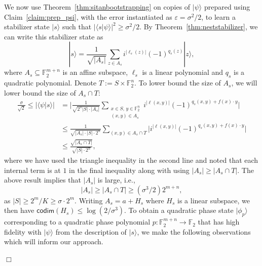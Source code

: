 \documentclass[11pt]{amsart}
\newcommand{\F}{\mathbb{F}} %
\newcommand{\ket}[1]{|#1\rangle}
\theoremstyle{plain}
\theoremstyle{definition}
\theoremstyle{remark}
\renewenvironment{proof}[1][]{
    	\begin{trivlist}
     	\item[\hspace{\labelsep}{\em\noindent Proof#1:\/}]}
     	{{\hfill$\Box$}
    	\end{trivlist}
  }
\begin{document}
\begin{proof}[ of Lemma~\ref{lem:findingfreimanquantum}]
We now use Theorem~\ref{thm:sitanbootstrapping} on copies of $\ket{\psi}$ prepared using Claim~\ref{claim:prep_psi}, with the error instantiated as $\varepsilon=\sigma^{2}/2$, to learn a stabilizer state $\ket{s}$ such that $|\langle s| \psi \rangle|^2 \geq \sigma^{2}/2$. By Theorem~\ref{thm:neststabilizer}, we can write this stabilizer state as
\begin{equation}\label{eq:stab_state_from_bootstrapping}
\ket{s} = \frac{1}{\sqrt{|A_s|}} \sum_{z \in A_s} i^{|\ell_s(z)|} (-1)^{q_s(z)} \ket{z},    
\end{equation}
where $A_s \subseteq \F_2^{m+n}$ is an affine subspace, $\ell_s$ is a linear polynomial and $q_s$ is a quadratic polynomial.
Denote $T:= S \times \F_2^n$.
To lower bound the size of $A_s$, we will lower bound the size of $A_s \cap T$:
\begin{align*}
\frac{\sigma}{\sqrt{2}} \leq |\langle \psi | s \rangle| 
&= \Big|\frac{1}{\sqrt{2^n |S|\cdot |A_s|}} \sum_{\substack{x \in S,\, y \in \F_2^n \\ (x,y) \in A_s}} i^{|\ell(x,y)|} (-1)^{q_s(x,y) + f(x)\cdot y} \Big| \\
&\leq \frac{1}{\sqrt{|A_s| \cdot |S|\cdot 2^n}} \sum_{(x,y) \in A_s \cap T} \Big| i^{|\ell(x,y)|} (-1)^{q_s(x,y) + f(x)\cdot y} \Big|\\
& \leq \frac{\sqrt{|A_s \cap T|}}{\sqrt{|S|\cdot 2^n}},    
\end{align*}
where we have used the triangle inequality in the second line and noted that each internal term is at $1$ in the final inequality along with using $|A_s| \geq |A_s \cap T|$. The above result implies that $|A_s|$ is large, i.e.,
\begin{equation}\label{eq:lb_size_As}
|A_s| \geq |A_s \cap T| \geq (\sigma^{3}/2) 2^{m+n},
\end{equation}
as $|S| \geq 2^m/K \geq \sigma \cdot 2^m$. Writing $A_s = a + H_s$ where $H_s$ is a linear subspace, we then have $\textsf{codim}(H_s) \leq \log(2/\sigma^{3})$. To obtain a quadratic phase state $\ket{\phi_p}$ corresponding to a quadratic phase polynomial $p:\F_2^{m+n} \rightarrow \F_2$ that has high fidelity with $\ket{\psi}$ from the description of $\ket{s}$, we make the following observations which will inform our approach.


\end{proof}
\end{document}
